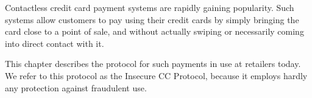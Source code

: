 Contactless credit card payment systems are rapidly gaining popularity.
Such systems allow customers to pay using their credit cards by simply bringing the card close to a point of sale,
    and without actually swiping or necessarily coming into direct contact with it.

This chapter describes the protocol for such payments in use at retailers today.
We refer to this protocol as the Insecure CC Protocol, because it employs hardly any protection against fraudulent use.
